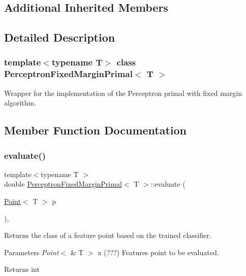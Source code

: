 \subsection*{Additional Inherited Members}


\subsection{Detailed Description}
\subsubsection*{template$<$typename T$>$\newline
class Perceptron\+Fixed\+Margin\+Primal$<$ T $>$}

Wrapper for the implementation of the Perceptron primal with fixed margin algorithm. 

\subsection{Member Function Documentation}
\mbox{\label{class_perceptron_fixed_margin_primal_a5bfe0f03533361017b594c3fe67f0905}} 
\subsubsection{\texorpdfstring{evaluate()}{evaluate()}}
{\footnotesize\ttfamily template$<$typename T $>$ \\
double \mbox{\hyperlink{class_perceptron_fixed_margin_primal}{Perceptron\+Fixed\+Margin\+Primal}}$<$ T $>$\+::evaluate (\begin{DoxyParamCaption}\item[{\mbox{\hyperlink{class_point}{Point}}$<$ T $>$}]{p }\end{DoxyParamCaption})\hspace{0.3cm}{\ttfamily [override]}, {\ttfamily [virtual]}}



Returns the class of a feature point based on the trained classifier. 


\begin{DoxyParams}{Parameters}
{\em Point$<$} & T $>$ x (???) Features point to be evaluated. \\
\hline
\end{DoxyParams}
\begin{DoxyReturn}{Returns}
int 
\end{DoxyReturn}


